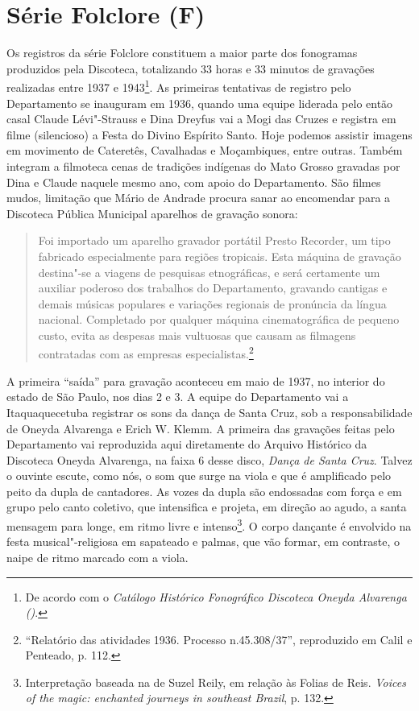 \section*{Série Folclore (F)}

Os registros da série Folclore constituem a maior parte dos fonogramas
produzidos pela Discoteca, totalizando 33 horas e 33 minutos de
gravações realizadas entre 1937 e 1943\footnote{De acordo com o
  \emph{Catálogo Histórico Fonográfico Discoteca Oneyda Alvarenga
  ()}.}. As primeiras tentativas de registro pelo Departamento se
inauguram em 1936, quando uma equipe liderada pelo então casal Claude
Lévi"-Strauss e Dina Dreyfus vai a Mogi das Cruzes e registra em filme
(silencioso) a Festa do Divino Espírito Santo. Hoje podemos assistir
imagens em movimento de Cateretês, Cavalhadas e Moçambiques, entre
outras. Também integram a filmoteca cenas de tradições indígenas do Mato
Grosso gravadas por Dina e Claude naquele mesmo ano, com apoio do
Departamento. São filmes mudos, limitação que Mário de Andrade procura
sanar ao encomendar para a Discoteca Pública Municipal aparelhos de
gravação sonora:

\begin{quote}
Foi importado um aparelho gravador portátil Presto Recorder, um tipo
fabricado especialmente para regiões tropicais. Esta máquina de gravação
destina"-se a viagens de pesquisas etnográficas, e será certamente um
auxiliar poderoso dos trabalhos do Departamento, gravando cantigas e
demais músicas populares e variações regionais de pronúncia da língua
nacional. Completado por qualquer máquina cinematográfica de pequeno
custo, evita as despesas mais vultuosas que causam as filmagens
contratadas com as empresas especialistas.\footnote{``Relatório das
  atividades 1936. Processo n.45.308/37'', reproduzido em Calil e
  Penteado, p. 112.}
\end{quote}

A primeira ``saída'' para gravação aconteceu em maio de 1937, no
interior do estado de São Paulo, nos dias 2 e 3. A equipe do
Departamento vai a Itaquaquecetuba registrar os sons da dança de Santa
Cruz, sob a responsabilidade de Oneyda Alvarenga e Erich W. Klemm. A
primeira das gravações feitas pelo Departamento vai reproduzida aqui
diretamente do Arquivo Histórico da Discoteca Oneyda Alvarenga, na faixa
6 desse disco, \emph{Dança de Santa Cruz}. Talvez o ouvinte escute, como
nós, o som que surge na viola e que é amplificado pelo peito da dupla de
cantadores. As vozes da dupla são endossadas com força e em grupo pelo
canto coletivo, que intensifica e projeta, em direção ao agudo, a santa
mensagem para longe, em ritmo livre e intenso\footnote{Interpretação
  baseada na de Suzel Reily, em relação às Folias de Reis. \emph{Voices
  of the magic: enchanted journeys in southeast Brazil}, p. 132.}. O
corpo dançante é envolvido na festa musical"-religiosa em sapateado e
palmas, que vão formar, em contraste, o naipe de ritmo marcado com a
viola.

